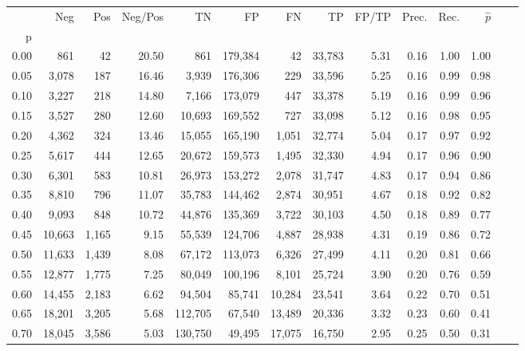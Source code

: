 \begin{tabular}{rrrrrrrrrrrrrr}
\toprule
{} &     Neg &    Pos & Neg/Pos &       TN &       FP &      FN &      TP & FP/TP & Prec. &  Rec. & $\hat{p}$ \\
p    &         &        &         &          &          &         &         &       &       &       &           \\
\midrule
0.00 &     861 &     42 &   20.50 &      861 &  179,384 &      42 &  33,783 &  5.31 &  0.16 &  1.00 &      1.00 \\
0.05 &   3,078 &    187 &   16.46 &    3,939 &  176,306 &     229 &  33,596 &  5.25 &  0.16 &  0.99 &      0.98 \\
0.10 &   3,227 &    218 &   14.80 &    7,166 &  173,079 &     447 &  33,378 &  5.19 &  0.16 &  0.99 &      0.96 \\
0.15 &   3,527 &    280 &   12.60 &   10,693 &  169,552 &     727 &  33,098 &  5.12 &  0.16 &  0.98 &      0.95 \\
0.20 &   4,362 &    324 &   13.46 &   15,055 &  165,190 &   1,051 &  32,774 &  5.04 &  0.17 &  0.97 &      0.92 \\
0.25 &   5,617 &    444 &   12.65 &   20,672 &  159,573 &   1,495 &  32,330 &  4.94 &  0.17 &  0.96 &      0.90 \\
0.30 &   6,301 &    583 &   10.81 &   26,973 &  153,272 &   2,078 &  31,747 &  4.83 &  0.17 &  0.94 &      0.86 \\
0.35 &   8,810 &    796 &   11.07 &   35,783 &  144,462 &   2,874 &  30,951 &  4.67 &  0.18 &  0.92 &      0.82 \\
0.40 &   9,093 &    848 &   10.72 &   44,876 &  135,369 &   3,722 &  30,103 &  4.50 &  0.18 &  0.89 &      0.77 \\
0.45 &  10,663 &  1,165 &    9.15 &   55,539 &  124,706 &   4,887 &  28,938 &  4.31 &  0.19 &  0.86 &      0.72 \\
0.50 &  11,633 &  1,439 &    8.08 &   67,172 &  113,073 &   6,326 &  27,499 &  4.11 &  0.20 &  0.81 &      0.66 \\
0.55 &  12,877 &  1,775 &    7.25 &   80,049 &  100,196 &   8,101 &  25,724 &  3.90 &  0.20 &  0.76 &      0.59 \\
0.60 &  14,455 &  2,183 &    6.62 &   94,504 &   85,741 &  10,284 &  23,541 &  3.64 &  0.22 &  0.70 &      0.51 \\
0.65 &  18,201 &  3,205 &    5.68 &  112,705 &   67,540 &  13,489 &  20,336 &  3.32 &  0.23 &  0.60 &      0.41 \\
0.70 &  18,045 &  3,586 &    5.03 &  130,750 &   49,495 &  17,075 &  16,750 &  2.95 &  0.25 &  0.50 &      0.31 \\

\end{tabular}
